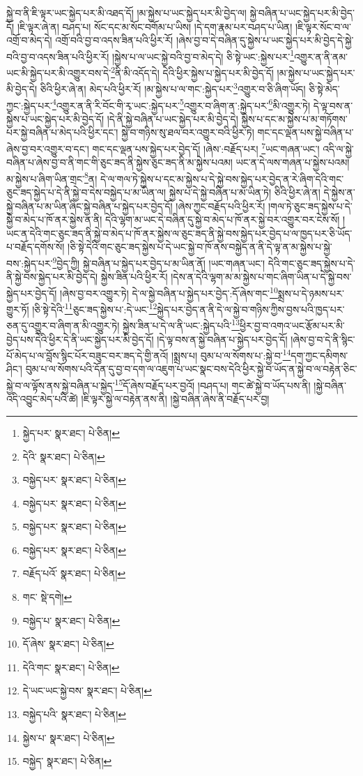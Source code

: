 སྐྱེ་བ་ནི་ཇི་ལྟར་ཡང་སྐྱེད་པར་མི་འཐད་དོ། །མ་སྐྱེས་པ་ཡང་སྐྱེད་པར་མི་བྱེད་ལ། སྐྱེ་བཞིན་པ་ཡང་སྐྱེད་པར་མི་བྱེད་དོ། །ཇི་ལྟར་ཞེ་ན། བཤད་པ། སོང་དང་མ་སོང་བགོམ་པ་ཡིས། །དེ་དག་རྣམ་པར་བཤད་པ་ཡིན། །ཇི་ལྟར་སོང་བ་ལ་འགྲོ་བ་མེད་དེ། འགྲོ་བའི་བྱ་བ་འདས་ཟིན་པའི་ཕྱིར་རོ། །ཞེས་བྱ་བ་དེ་བཞིན་དུ་སྐྱེས་པ་ཡང་སྐྱེད་པར་མི་བྱེད་དེ་སྐྱེ་བའི་བྱ་བ་འདས་ཟིན་པའི་ཕྱིར་རོ། །སྐྱེས་པ་ལ་ཡང་སྐྱེ་བའི་བྱ་བ་མེད་དེ། ཅི་སྟེ་ཡང་:སྐྱེས་པར་\footnote{སྐྱེད་པར་  སྣར་ཐང་།  པེ་ཅིན། }འགྱུར་ན་ནི་ནམ་ཡང་མི་སྐྱེད་པར་མི་འགྱུར་བས་དེ་\footnote{དེའི་  སྣར་ཐང་།  པེ་ཅིན། }ནི་མི་འདོད་དེ། དེའི་ཕྱིར་སྐྱེས་པ་སྐྱེད་པར་མི་བྱེད་དོ། །མ་སྐྱེས་པ་ཡང་སྐྱེད་པར་མི་བྱེད་དེ། ཅིའི་ཕྱིར་ཞེ་ན། མེད་པའི་ཕྱིར་རོ། །མ་སྐྱེས་པ་ལ་གང་:སྐྱེད་པར་\footnote{བསྐྱེད་པར་  སྣར་ཐང་།  པེ་ཅིན། }འགྱུར་བ་ཅི་ཞིག་ཡོད། ཅི་སྟེ་མེད་ཀྱང་:སྐྱེད་པར་\footnote{བསྐྱེད་པར་  སྣར་ཐང་།  པེ་ཅིན། }འགྱུར་ན་ནི་རི་བོང་གི་རྭ་ཡང་:སྐྱེད་པར་\footnote{བསྐྱེད་པར་  སྣར་ཐང་།  པེ་ཅིན། }འགྱུར་བ་ཞིག་ན་:སྐྱེད་པར་\footnote{བསྐྱེད་པར་  སྣར་ཐང་།  པེ་ཅིན། }མི་འགྱུར་ཏེ། དེ་ལྟ་བས་ན་སྐྱེས་པ་ཡང་སྐྱེད་པར་མི་བྱེད་དོ། །དེ་ནི་སྐྱེ་བཞིན་པ་ཡང་སྐྱེད་པར་མི་བྱེད་དེ། སྐྱེས་པ་དང་མ་སྐྱེས་པ་མ་གཏོགས་པར་སྐྱེ་བཞིན་པ་མེད་པའི་ཕྱིར་དང་། སྐྱེ་བ་གཉིས་སུ་ཐལ་བར་འགྱུར་བའི་ཕྱིར་ཏེ། གང་དང་ལྡན་པས་སྐྱེ་བཞིན་པ་ཞེས་བྱ་བར་འགྱུར་བ་དང་། གང་དང་ལྡན་པས་སྐྱེད་པར་བྱེད་དོ། །ཞེས་:བརྗོད་པར། \footnote{བརྗོད་པའོ་  སྣར་ཐང་།  པེ་ཅིན། }ཡང་གཞན་ཡང་། འདི་ལ་སྐྱེ་བཞིན་པ་ཞེས་བྱ་བ་ནི་གང་གི་ཅུང་ཟད་ནི་སྐྱེས་ཅུང་ཟད་ནི་མ་སྐྱེས་པའམ། ཡང་ན་དེ་ལས་གཞན་པ་སྐྱེས་པའམ། མ་སྐྱེས་པ་ཞིག་ཡིན་གྲང་\footnote{གང་  སྡེ་དགེ། }ན། དེ་ལ་གལ་ཏེ་སྐྱེས་པ་དང་མ་སྐྱེས་པ་དེ་སྐྱེ་བས་སྐྱེད་པར་བྱེད་ན་རེ་ཞིག་དེའི་གང་ཅུང་ཟད་སྐྱེད་པ་དེ་ནི་སྐྱེ་བ་དེས་བསྐྱེད་པ་མ་ཡིན་ལ། སྐྱེས་པ་དེ་སྐྱེ་བཞིན་པ་མ་ཡིན་ཏེ། ཅིའི་ཕྱིར་ཞེ་ན། དེ་སྐྱེས་ན་སྐྱེ་བཞིན་པ་མ་ཡིན་ཞིང་སྐྱེ་བཞིན་པ་སྐྱེད་པར་བྱེད་དོ། །ཞེས་ཀྱང་བརྗོད་པའི་ཕྱིར་རོ། །གལ་ཏེ་ཅུང་ཟད་སྐྱེས་པ་དེ་སྐྱེ་བ་མེད་པ་ཁོ་ནར་སྐྱེས་ན་ནི། དེའི་ལྷག་མ་ཡང་དེ་བཞིན་དུ་སྐྱེ་བ་མེད་པ་ཁོ་ནར་སྐྱེ་བར་འགྱུར་བར་ངེས་སོ། །ཡང་ན་དེའི་གང་ཅུང་ཟད་ནི་སྐྱེ་བ་མེད་པ་ཁོ་ནར་སྐྱེས་ལ་ཅུང་ཟད་ནི་སྐྱེ་བས་སྐྱེད་པར་བྱེད་པ་ལ་ཁྱད་པར་ཅི་ཡོད་པ་བརྗོད་དགོས་སོ། །ཅི་སྟེ་དེའི་གང་ཅུང་ཟད་སྐྱེས་པ་དེ་ཡང་སྐྱེ་བ་ཁོ་ནས་བསྐྱེད་ན་ནི་དེ་ལྟ་ན་མ་སྐྱེས་པ་སྐྱེ་བས་:སྐྱེད་པར་\footnote{བསྐྱེད་པ་  སྣར་ཐང་།  པེ་ཅིན། }བྱེད་ཀྱི། སྐྱེ་བཞིན་པ་སྐྱེད་པར་བྱེད་པ་མ་ཡིན་ནོ། །ཡང་གཞན་ཡང་། དེའི་གང་ཅུང་ཟད་སྐྱེས་པ་དེ་ནི་སྐྱེ་བས་སྐྱེད་པར་མི་བྱེད་དེ། སྐྱེས་ཟིན་པའི་ཕྱིར་རོ། །དེས་ན་དེའི་ལྷག་མ་མ་སྐྱེས་པ་གང་ཞིག་ཡིན་པ་དེ་སྐྱེ་བས་སྐྱེད་པར་བྱེད་དོ། །ཞེས་བྱ་བར་འགྱུར་ཏེ། དེ་ལ་སྐྱེ་བཞིན་པ་སྐྱེད་པར་བྱེད་:དོ་ཞེས་གང་\footnote{དོ་ཞེས་  སྣར་ཐང་།  པེ་ཅིན། }སྨྲས་པ་དེ་ཉམས་པར་གྱུར་ཏོ། །ཅི་སྟེ་དེའི་\footnote{དེའི་གང་  སྣར་ཐང་།  པེ་ཅིན། }ཅུང་ཟད་སྐྱེས་པ་:དེ་ཡང་\footnote{དེ་ཡང་ཡང་སྐྱེ་བས་  སྣར་ཐང་།  པེ་ཅིན། }སྐྱེད་པར་བྱེད་ན་ནི་དེ་ལ་སྐྱེ་བ་གཉིས་ཀྱིས་བྱས་པའི་ཁྱད་པར་ཅན་དུ་འགྱུར་བ་ཞིག་ན་མི་འགྱུར་ཏེ། སྐྱེས་ཟིན་པ་དེ་ལ་ནི་ཡང་:སྐྱེད་པའི་\footnote{བསྐྱེད་པའི་  སྣར་ཐང་།  པེ་ཅིན། }ཕྱིར་བྱ་བ་འགའ་ཡང་རྩོམ་པར་མི་བྱེད་པས་དེའི་ཕྱིར་དེ་ནི་ཡང་སྐྱེད་པར་མི་བྱེད་དོ། །དེ་ལྟ་བས་ན་སྐྱེ་བཞིན་པ་སྐྱེད་པར་བྱེད་དོ། །ཞེས་བྱ་བ་དེ་ནི་སྙིང་པོ་མེད་པ་ལ་བློས་སྙིང་པོར་བཟུང་བར་ཟད་དེ་གྱི་ནའོ། །སྨྲས་པ། བུམ་པ་ལ་སོགས་པ་:སྐྱེ་བ་\footnote{སྐྱེས་པ་  སྣར་ཐང་།  པེ་ཅིན། }དག་ཀྱང་དམིགས་ཤིང་། བུམ་པ་ལ་སོགས་པའི་དོན་དུ་བྱ་བ་དག་ལ་འཇུག་པ་ཡང་སྣང་བས་དེའི་ཕྱིར་སྐྱེ་བ་ཡོད་ན་སྐྱེ་བ་ལ་བརྟེན་ཅིང་སྐྱེ་བ་ལ་ལྟོས་ནས་སྐྱེ་བཞིན་པ་སྐྱེད་\footnote{བསྐྱེད་  སྣར་ཐང་།  པེ་ཅིན། }དོ་ཞེས་བརྗོད་པར་བྱའོ། །བཤད་པ། གང་ཚེ་སྐྱེ་བ་ཡོད་པས་ནི། །སྐྱེ་བཞིན་འདི་འབྱུང་མེད་པའི་ཚེ། །ཇི་ལྟར་སྐྱེ་ལ་བརྟེན་ནས་ནི། །སྐྱེ་བཞིན་ཞེས་ནི་བརྗོད་པར་བྱ། 